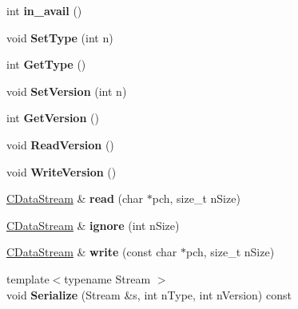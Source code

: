 \begin{DoxyCompactItemize}
int {\bfseries in\+\_\+avail} ()
\item 
\mbox{\label{class_c_data_stream_a92467b36f5b2edff8becb5eadec633ce}} 
void {\bfseries Set\+Type} (int n)
\item 
\mbox{\label{class_c_data_stream_a14bc0652cfd49850a032f0a1651456a7}} 
int {\bfseries Get\+Type} ()
\item 
\mbox{\label{class_c_data_stream_a267d1315f3f9e9bcf9e7168beaa240c4}} 
void {\bfseries Set\+Version} (int n)
\item 
\mbox{\label{class_c_data_stream_acb7af65ccac8273fc694a25796814ddc}} 
int {\bfseries Get\+Version} ()
\item 
\mbox{\label{class_c_data_stream_ad8f97bbd83ef3d2eebfd3f9c82f55260}} 
void {\bfseries Read\+Version} ()
\item 
\mbox{\label{class_c_data_stream_a35d49028155fb47d2bb5c2dbaf31bc8e}} 
void {\bfseries Write\+Version} ()
\item 
\mbox{\label{class_c_data_stream_af3743932a68e3ee3f1dbd357993a51ae}} 
\mbox{\hyperlink{class_c_data_stream}{C\+Data\+Stream}} \& {\bfseries read} (char $\ast$pch, size\+\_\+t n\+Size)
\item 
\mbox{\label{class_c_data_stream_aebfcaa009d328a208dbbcd13db846dd6}} 
\mbox{\hyperlink{class_c_data_stream}{C\+Data\+Stream}} \& {\bfseries ignore} (int n\+Size)
\item 
\mbox{\label{class_c_data_stream_abcab3fa1be7676ffdb34908ec7c84b78}} 
\mbox{\hyperlink{class_c_data_stream}{C\+Data\+Stream}} \& {\bfseries write} (const char $\ast$pch, size\+\_\+t n\+Size)
\item 
\mbox{\label{class_c_data_stream_aea93472150507d03dff6dedda4a8208c}} 
{\footnotesize template$<$typename Stream $>$ }\\void {\bfseries Serialize} (Stream \&s, int n\+Type, int n\+Version) const
\item 

\end{DoxyCompactItemize}

